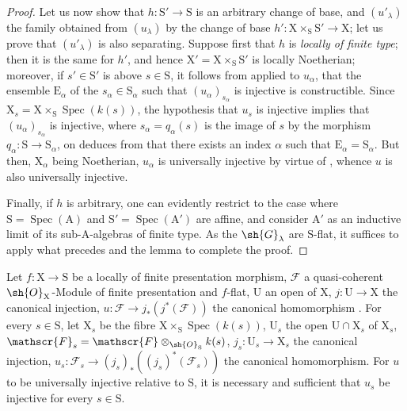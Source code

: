 \begin{proof}
Let us now show that $h:\mathrm{S}'\to\mathrm{S}$ is an arbitrary change of base, and $(u'_\lambda)$ the family obtained from $(u_\lambda)$ by the change of base $h':\mathrm{X}\times_\mathrm{S}\mathrm{S}'\to\mathrm{X}$; let us prove that $(u'_\lambda)$ is also separating.
Suppose first that $h$ is \emph{locally of finite type}; then it is the same for $h'$, and hence $\mathrm{X}'=\mathrm{X}\times_\mathrm{S}\mathrm{S}'$ is locally Noetherian; moreover, if $s'\in\mathrm{S}'$ is above $s\in\mathrm{S}$, it follows from  applied to $u_\alpha$, that the ensemble $\mathrm{E}_\alpha$ of the $s_\alpha\in\mathrm{S}_\alpha$ such that $(u_\alpha)_{s_\alpha}$ is injective is constructible.
Since $\mathrm{X}_s=\mathrm{X}\times_\mathrm{S}\operatorname{Spec}(k(s))$, the hypothesis that $u_s$ is injective implies that $(u_\alpha)_{s_\alpha}$ is injective, where $s_\alpha=q_\alpha(s)$ is the image of $s$ by the morphism $q_\alpha:\mathrm{S}\to\mathrm{S}_\alpha$, on deduces from  that there exists an index $\alpha$ such that $\mathrm{E}_\alpha=\mathrm{S}_\alpha$.
But then, $\mathrm{X}_\alpha$ being Noetherian, $u_\alpha$ is universally injective by virtue of , whence $u$ is also universally injective.

Finally, if $h$ is arbitrary, one can evidently restrict to the case where $\mathrm{S}=\operatorname{Spec}(\mathrm{A})$ and $\mathrm{S}'=\operatorname{Spec}(\mathrm{A}')$ are affine, and consider $\mathrm{A}'$ as an inductive limit of its sub-$\mathrm{A}$-algebras of finite type.
As the $\sh{G}_\lambda$ are $\mathrm{S}$-flat, it suffices to apply what precedes and the lemma  to complete the proof.
\end{proof}

\begin{proposition}[11.9.17]
\label{IV.11.9.17}
Let $f:\mathrm{X}\to\mathrm{S}$ be a locally of finite presentation morphism, $\mathscr{F}$ a quasi-coherent $\sh{O}_\mathrm{X}$-Module of finite presentation and $f$-flat, $\mathrm{U}$ an open of $\mathrm{X}$, $j:\mathrm{U}\to\mathrm{X}$ the canonical injection, $u:\mathscr{F}\to j_*(j^*(\mathscr{F}))$ the canonical homomorphism .
For every $s\in\mathrm{S}$, let $\mathrm{X}_s$ be the fibre $\mathrm{X}\times_\mathrm{S}\operatorname{Spec}(k(s))$, $\mathrm{U}_s$ the open $\mathrm{U}\cap\mathrm{X}_s$ of $\mathrm{X}_s$, $\mathscr{F}_s=\mathscr{F}\otimes_{\sh{O}_\mathrm{S}}k(s)$, $j_s:\mathrm{U}_s\to\mathrm{X}_s$ the canonical injection, $u_s:\mathscr{F}_s\to(j_s)_*((j_s)^*(\mathscr{F}_s))$ the canonical homomorphism.
For $u$ to be universally injective relative to $\mathrm{S}$, it is necessary and sufficient that $u_s$ be injective for every $s\in\mathrm{S}$.
\end{proposition}

